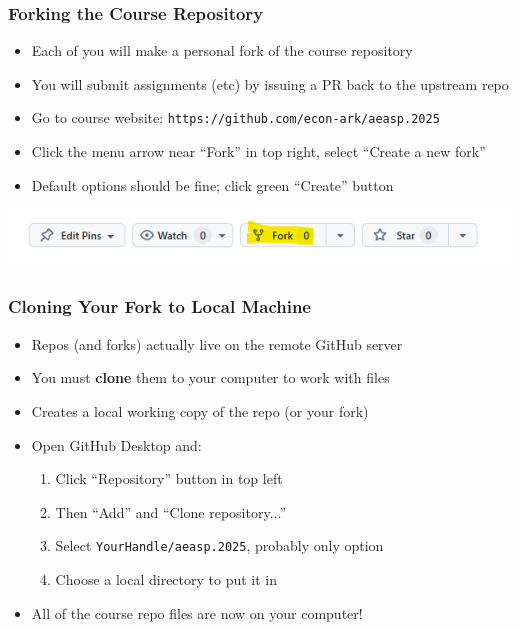 \documentclass[aspectratio=169]{beamer}
\begin{document}
\begin{frame}
\frametitle{Forking the Course Repository}
\begin{itemize}
	\item Each of you will make a personal fork of the course repository
	
	\item You will submit assignments (etc) by issuing a PR back to the upstream repo
	
	\item Go to course website: \texttt{https://github.com/econ-ark/aeasp.2025}
	
	\item Click the menu arrow near ``Fork'' in top right, select ``Create a new fork''
	
	\item Default options should be fine; click green ``Create'' button	
\end{itemize}

{\centering
\includegraphics[scale=1.0]{../../media/github_fork.png}}
\end{frame}


\begin{frame}
\frametitle{Cloning Your Fork to Local Machine}
\begin{itemize}
	\item Repos (and forks) actually live on the remote GitHub server
	
	\item You must \textbf{clone} them to your computer to work with files
	
	\item Creates a local working copy of the repo (or your fork)
	
	\item Open GitHub Desktop and:
	\begin{enumerate}
		\item Click ``Repository'' button in top left
		
		\item Then ``Add'' and ``Clone repository...''
		
		\item Select \texttt{YourHandle/aeasp.2025}, probably only option
		
		\item Choose a local directory to put it in
	\end{enumerate}

	\item All of the course repo files are now on your computer!
\end{itemize}
\end{frame}
\end{document}
